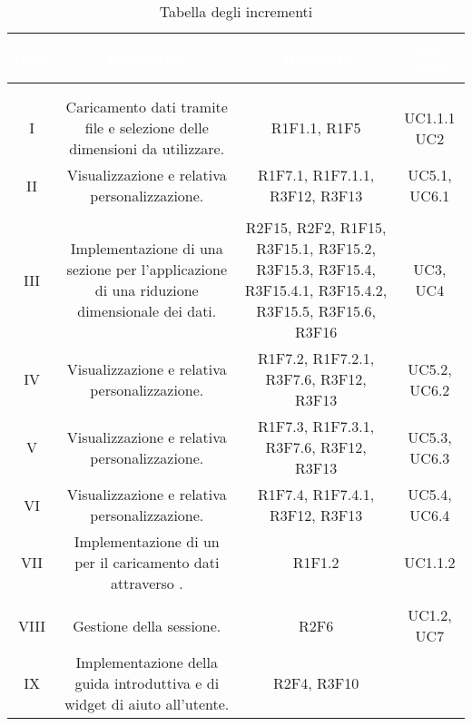 \setlength\colA{1.5cm}
\setlength\colB{8cm}
\setlength\colC{4cm}
\setlength\colD{2cm}
\setlength\total{\dimexpr\colA+\colB+\colC+\colD+6\tabcolsep\relax}
\begin{longtable}{C{\colA} C{\colB} C{\colC} C{\colD}}
		\textcolor{white}{\textbf{Incr.}} & 
		\textcolor{white}{\textbf{Obbiettivo}} & 
		\textcolor{white}{\textbf{Requisiti}} & 
		\textcolor{white}{\textbf{Casi d'uso}} \\
		\endfirsthead
	    \\
	    \endfoot
	    \caption{Tabella degli incrementi}
	    \endlastfoot


\\
I &
Caricamento dati tramite file e selezione delle dimensioni da utilizzare.& 
R1F1.1, R1F5 & 
UC1.1.1 \newline UC2\\
II &
Visualizzazione  e relativa personalizzazione.& 
R1F7.1, R1F7.1.1, R3F12, R3F13 & 
UC5.1, UC6.1\\
\\
III & 
Implementazione di una sezione per l'applicazione di una riduzione dimensionale dei dati. & 
R2F15, R2F2, R1F15, R3F15.1, R3F15.2, R3F15.3, R3F15.4, R3F15.4.1, R3F15.4.2, R3F15.5, R3F15.6, R3F16& 
UC3, UC4\\
IV & 
Visualizzazione  e relativa personalizzazione. & 
R1F7.2, R1F7.2.1, R3F7.6, R3F12, R3F13 & 
UC5.2, UC6.2\\
V & 
Visualizzazione  e relativa personalizzazione. & 
R1F7.3, R1F7.3.1, R3F7.6, R3F12, R3F13& 
UC5.3, UC6.3\\
VI & 
Visualizzazione  e relativa personalizzazione. & 
R1F7.4, R1F7.4.1, R3F12, R3F13& 
UC5.4, UC6.4\\
VII & 
Implementazione di un  per il caricamento dati attraverso . & 
R1F1.2 & 
UC1.1.2\\

\\
VIII & 
Gestione della sessione. & 
R2F6 & 
UC1.2, UC7\\
IX & 
Implementazione della guida introduttiva e di widget di aiuto all'utente. & 
R2F4, R3F10& 
\\


\end{longtable}
